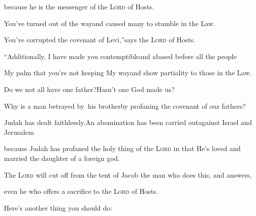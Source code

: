 \begin{inparaenum}
  \pc because he is the messenger of the \textsc{Lord} of Hosts.%
  
  \pb {} You've turned out of the way\pa and caused many to stumble in the Law.%
  
  \pc You've corrupted the covenant of Levi,''\pa says the \textsc{Lord} of Hosts.%
  
  \pb {} ``Additionally, I have made you contemptible\pa and abased before all the people%
  
  \pc My palm that you're not keeping My way\pa and show partiality%
  to those%
  in the Law.%
  
  \pa {} Do we not all have one father?\pa Hasn't one God made us?%
  
  \pb Why is a man betrayed by\footnotemark\ his brother\pa by profaning the covenant of our fathers?%
  
  \pa {} Judah has dealt faithlessly.\pa An abomination has been carried out\pa against Israel and Jerusalem%
  
  \pc %
  because Judah has profaned the holy thing of the \textsc{Lord} in that He's loved and married the daughter of a foreign god.%
  
  \pb {} The \textsc{Lord} will cut off from the tent of Jacob the man who does this, %
  and answers,%
  
  \pc even he who offers a sacrifice to the \textsc{Lord} of Hosts.%
  
  \pa {} Here's another thing you should do:%
  

\end{inparaenum}

